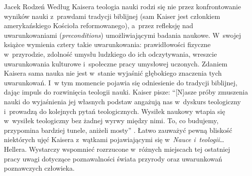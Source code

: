 \begin{newrevplenv}{Jacek Rodzeń}
Według Kaisera teologia nauki rodzi się nie przez konfrontowanie wyników nauki z~prawdami tradycji biblijnej (sam Kaiser jest członkiem amerykańskiego Kościoła reformowanego), a~przez refleksję nad uwarunkowaniami (\textit{preconditions}) umożliwiającymi badania naukowe. W~swojej książce wymienia cztery takie uwarunkowania: prawidłowości fizyczne w~przyrodzie, zdolność umysłu ludzkiego do ich odczytywania, wreszcie uwarunkowania kulturowe i~społeczne pracy umysłowej uczonych. Zdaniem Kaisera sama nauka nie jest w~stanie wyjaśnić głębokiego znaczenia tych uwarunkowań. I~w tym momencie pojawia się odniesienie do tradycji biblijnej, dając impuls do rozwinięcia teologii nauki. Kaiser pisze: “[N]asze próby zmuszenia nauki do wyjaśnienia jej własnych podstaw angażują nas w~dyskurs teologiczny i~prowadzą do kolejnych pytań teologicznych. Wysiłek naukowy wtapia się w~wysiłek teologiczny bez żadnej wyrwy między nimi. To, co budujemy, przypomina bardziej tunele, aniżeli mosty''
\parencite[][s.~124]{kaiser_toward_2007}. %
 Łatwo zauważyć pewną bliskość niektórych ujęć Kaisera z~wątkami pojawiającymi się w~\textit{Nauce i~teologii}… Hellera. Wystarczy wspomnieć rozrzucone w~różnych miejscach tej ostatniej pracy uwagi dotyczące poznawalności świata przyrody oraz uwarunkowań poznawczych człowieka.


\end{newrevplenv}
